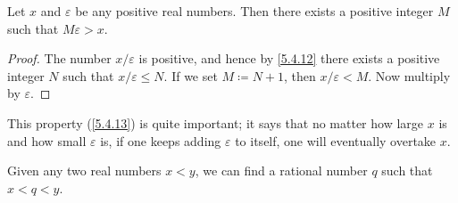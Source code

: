\begin{cor}\label{5.4.13}
  Let \(x\) and \(\varepsilon\) be any positive real numbers.
  Then there exists a positive integer \(M\) such that \(M\varepsilon > x\).
\end{cor}

\begin{proof}
  The number \(x / \varepsilon\) is positive, and hence by \cref{5.4.12} there exists a positive integer \(N\) such that \(x / \varepsilon \leq N\).
  If we set \(M \coloneqq N + 1\), then \(x / \varepsilon < M\).
  Now multiply by \(\varepsilon\).
\end{proof}

\begin{note}
  This property (\cref{5.4.13}) is quite important;
  it says that no matter how large \(x\) is and how small \(\varepsilon\) is, if one keeps adding \(\varepsilon\) to itself, one will eventually overtake \(x\).
\end{note}

\begin{prop}\label{5.4.14}
  Given any two real numbers \(x < y\), we can find a rational number \(q\) such that \(x < q < y\).
\end{prop}

